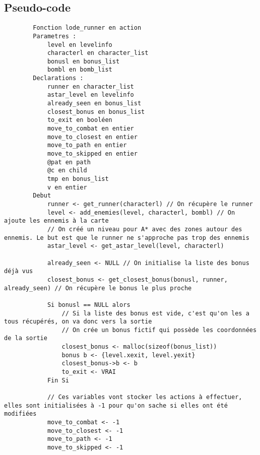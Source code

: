 \newpage

\subsection{Pseudo-code}

\begin{longlisting}
    \begin{verbatim}
        Fonction lode_runner en action
        Parametres :
            level en levelinfo
            characterl en character_list
            bonusl en bonus_list
            bombl en bomb_list
        Declarations :
            runner en character_list
            astar_level en levelinfo
            already_seen en bonus_list
            closest_bonus en bonus_list
            to_exit en booléen
            move_to_combat en entier
            move_to_closest en entier
            move_to_path en entier
            move_to_skipped en entier
            @pat en path
            @c en child
            tmp en bonus_list
            v en entier
        Debut
            runner <- get_runner(characterl) // On récupère le runner
            level <- add_enemies(level, characterl, bombl) // On ajoute les ennemis à la carte
            // On créé un niveau pour A* avec des zones autour des ennemis. Le but est que le runner ne s'approche pas trop des ennemis
            astar_level <- get_astar_level(level, characterl) 

            already_seen <- NULL // On initialise la liste des bonus déjà vus
            closest_bonus <- get_closest_bonus(bonusl, runner, already_seen) // On récupère le bonus le plus proche

            Si bonusl == NULL alors
                // Si la liste des bonus est vide, c'est qu'on les a tous récupérés, on va donc vers la sortie
                // On crée un bonus fictif qui possède les coordonnées de la sortie
                closest_bonus <- malloc(sizeof(bonus_list))
                bonus b <- {level.xexit, level.yexit}
                closest_bonus->b <- b
                to_exit <- VRAI
            Fin Si

            // Ces variables vont stocker les actions à effectuer, elles sont initialisées à -1 pour qu'on sache si elles ont été modifiées
            move_to_combat <- -1
            move_to_closest <- -1
            move_to_path <- -1
            move_to_skipped <- -1


\end{verbatim}
\end{longlisting}
